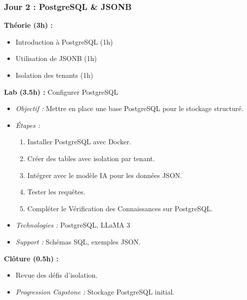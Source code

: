 \documentclass[11pt]{article}
\begin{document}
\subsubsection{Jour 2 : PostgreSQL \& JSONB}
\textbf{Théorie (3h) :}
\begin{itemize}
    \item Introduction à PostgreSQL (1h)
    \item Utilisation de JSONB (1h)
    \item Isolation des tenants (1h)
\end{itemize}
\textbf{Lab (3.5h) :} Configurer PostgreSQL
\begin{itemize}
    \item \textit{Objectif :} Mettre en place une base PostgreSQL pour le stockage structuré.
    \item \textit{Étapes :}
        \begin{enumerate}
            \item Installer PostgreSQL avec Docker.
            \item Créer des tables avec isolation par tenant.
            \item Intégrer avec le modèle IA pour les données JSON.
            \item Tester les requêtes.
            \item Compléter le Vérification des Connaissances sur PostgreSQL.
        \end{enumerate}
    \item \textit{Technologies :} PostgreSQL, LLaMA 3
    \item \textit{Support :} Schémas SQL, exemples JSON.
\end{itemize}
\textbf{Clôture (0.5h) :}
\begin{itemize}
    \item Revue des défis d'isolation.
    \item \textit{Progression Capstone :} Stockage PostgreSQL initial.
\end{itemize}
\end{document}
